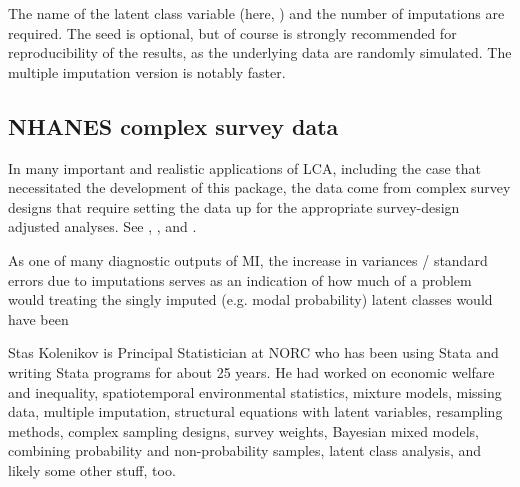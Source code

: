 The name of the latent class variable (here, )
and the number of imputations are required. The seed is optional,
but of course is strongly recommended for reproducibility of the results,
as the underlying data are randomly simulated.
The multiple imputation version is notably faster.

\subsection{NHANES complex survey data}

In many important and realistic applications of LCA, including the case
that necessitated the development of this package, the data come from
complex survey designs that require setting the data up for the appropriate
survey-design adjusted analyses. See , ,
and \citet{kolenikov:pitblado:2014}.

As one of many diagnostic outputs of MI, the increase in variances / standard errors
due to imputations serves as an indication of how much of a problem
would treating the singly imputed (e.g. modal probability) latent classes would have been



\newpage







\begin{aboutauthors}
Stas Kolenikov is Principal Statistician at NORC who has been
using Stata and writing Stata programs for about 25 years.
He had worked on economic welfare and inequality, spatiotemporal
environmental statistics, mixture models, missing data,
multiple imputation, structural equations with latent variables,
resampling methods, complex sampling designs, survey weights,
Bayesian mixed models, combining probability and non-probability samples,
latent class analysis, and likely some other stuff, too.
\end{aboutauthors}

\endinput

